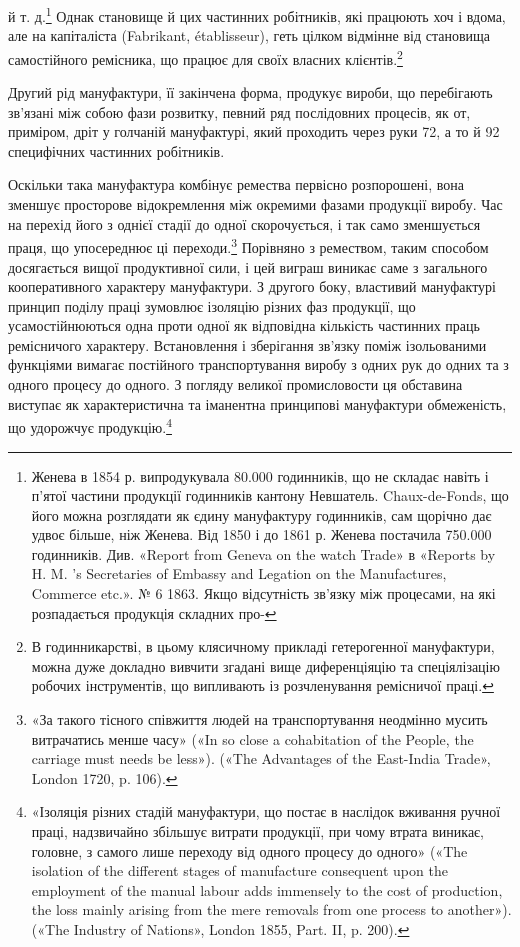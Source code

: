 й т. д.\footnote{
Женева в 1854 р. випродукувала 80.000 годинників, що не складає
навіть і п’ятої частини продукції годинників кантону Невшатель.
Chaux-de-Fonds, що його можна розглядати як єдину мануфактуру годинників,
сам щорічно дає удвоє більше, ніж Женева. Від 1850 і до 1861 р.
Женева постачила 750.000 годинників. Див. «Report from Geneva on
the watch Trade» в «Reports by H. M. ’s Secretaries of Embassy and Legation
on the Manufactures, Commerce etc.». № 6 1863. Якщо відсутність
зв’язку між процесами, на які розпадається продукція складних про-
} Однак становище й цих частинних робітників, які працюють
хоч і вдома, але на капіталіста (Fabrikant, établisseur),
геть цілком відмінне від становища самостійного ремісника, що
працює для своїх власних клієнтів.\footnote{
В годинникарстві, в цьому клясичному прикладі гетерогенної
мануфактури, можна дуже докладно вивчити згадані вище диференціяцію
та спеціялізацію робочих інструментів, що випливають із розчленування
ремісничої праці.
}

Другий рід мануфактури, її закінчена форма, продукує
вироби, що перебігають зв’язані між собою фази розвитку, певний
ряд послідовних процесів, як от, приміром, дріт у голчаній
мануфактурі, який проходить через руки 72, а то й 92 специфічних
частинних робітників.

Оскільки така мануфактура комбінує ремества первісно розпорошені,
вона зменшує просторове відокремлення між окремими
фазами продукції виробу. Час на перехід його з однієї
стадії до одної скорочується, і так само зменшується праця, що
упосереднює ці переходи.\footnote{
«За такого тісного співжиття людей на транспортування неодмінно
мусить витрачатись менше часу» («In so close a cohabitation
of the People, the carriage must needs be less»). («The Advantages of the
East-India Trade», London 1720, p. 106).
} Порівняно з ремеством, таким способом
досягається вищої продуктивної сили, і цей виграш виникає
саме з загального кооперативного характеру мануфактури.
З другого боку, властивий мануфактурі принцип поділу праці
зумовлює ізоляцію різних фаз продукції, що усамостійнюються
одна проти одної як відповідна кількість частинних праць ремісничого
характеру. Встановлення і зберігання зв’язку поміж
ізольованими функціями вимагає постійного транспортування
виробу з одних рук до одних та з одного процесу до одного.
З погляду великої промисловости ця обставина виступає як характеристична
та іманентна принципові мануфактури обмеженість,
що удорожчує продукцію.\footnote{
«Ізоляція різних стадій мануфактури, що постає в наслідок вживання
ручної праці, надзвичайно збільшує витрати продукції, при чому
втрата виникає, головне, з самого лише переходу від одного процесу
до одного» («The isolation of the different stages of manufacture consequent
upon the employment of the manual labour adds immensely to
the cost of production, the loss mainly arising from the mere removals from
one process to another»). («The Industry of Nations», London 1855,
Part. II, p. 200).
}

